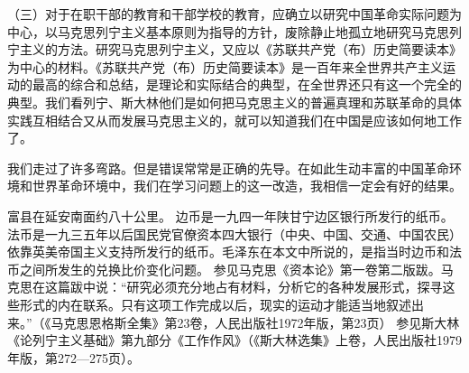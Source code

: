 （三）对于在职干部的教育和干部学校的教育，应确立以研究中国革命实际问题为中心，以马克思列宁主义基本原则为指导的方针，废除静止地孤立地研究马克思列宁主义的方法。研究马克思列宁主义，又应以《苏联共产党（布）历史简要读本》为中心的材料。《苏联共产党（布）历史简要读本》是一百年来全世界共产主义运动的最高的综合和总结，是理论和实际结合的典型，在全世界还只有这一个完全的典型。我们看列宁、斯大林他们是如何把马克思主义的普遍真理和苏联革命的具体实践互相结合又从而发展马克思主义的，就可以知道我们在中国是应该如何地工作了。

我们走过了许多弯路。但是错误常常是正确的先导。在如此生动丰富的中国革命环境和世界革命环境中，我们在学习问题上的这一改造，我相信一定会有好的结果。


\begin{maonote}
富县在延安南面约八十公里。
边币是一九四一年陕甘宁边区银行所发行的纸币。法币是一九三五年以后国民党官僚资本四大银行（中央、中国、交通、中国农民）依靠英美帝国主义支持所发行的纸币。毛泽东在本文中所说的，是指当时边币和法币之间所发生的兑换比价变化问题。
参见马克思《资本论》第一卷第二版跋。马克思在这篇跋中说：“研究必须充分地占有材料，分析它的各种发展形式，探寻这些形式的内在联系。只有这项工作完成以后，现实的运动才能适当地叙述出来。”（《马克思恩格斯全集》第23卷，人民出版社1972年版，第23页）
参见斯大林《论列宁主义基础》第九部分《工作作风》（《斯大林选集》上卷，人民出版社1979年版，第272—275页）。
\end{maonote}
